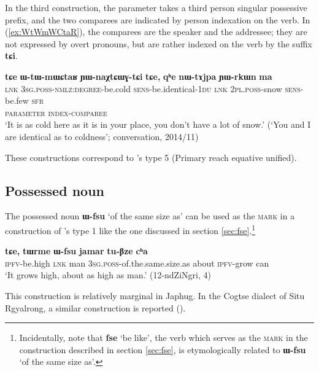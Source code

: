 \documentclass[oneside,a4paper,11pt]{article}
\newcommand{\ipa}[1]{{\phon\textbf{#1}}} %
\newcommand{\forme}[2]{\ipa{#1} `#2'}
\begin{document}
In the third construction, the parameter takes a third person singular possessive prefix, and the two comparees are indicated by person indexation on the verb. In (\ref{ex:WtWmWCtaR}), the comparees are the speaker and the addressee; they are not expressed by overt pronouns, but are rather indexed on the verb by the suffix \ipa{tɕi}.

\begin{exe}
\ex \label{ex:WtWmWCtaR}
\glll
\ipa{tɕe} 	\ipa{ɯ-tɯ-mɯɕtaʁ} 	\ipa{ɲɯ-naχtɕɯɣ-tɕi} 	\ipa{tɕe,} 	\ipa{qʰe} 	\ipa{nɯ-tɤjpa} 	\ipa{ɲɯ-rkɯn} 	\ipa{ma} \\
\textsc{lnk} \textsc{3sg.poss-nmlz:degree}-be.cold \textsc{sens}-be.identical-\textsc{1du} \textsc{lnk} \textsc{2pl.poss}-snow \textsc{sens}-be.few \textsc{sfr} \\
{ } \textsc{parameter} \textsc{index-comparee} \\
\glt `It is as cold here as it is in your place, you don't have a lot of snow.' (`You and I are identical as to coldness'; conversation, 2014/11)
\end{exe}

These constructions correspond to \citet{haspelmath17equative}'s type 5 (Primary reach equative unified).

\subsection{Possessed noun} \label{sec:Wfsu}
The possessed noun \forme{ɯ-fsu}{of the same size as} can be used as the \textsc{mark} in a construction of \citet{haspelmath17equative}'s type 1 like the one discussed in section \ref{sec:fse}.\footnote{Incidentally, note that \forme{fse}{be like}, the verb which serves as the \textsc{mark} in the construction described in section \ref{sec:fse}, is etymologically related to \forme{ɯ-fsu}{of the same size as}.}

\begin{exe}
\ex \label{ex:Wfsu}
\gll \ipa{tu-mbro} 	\ipa{tɕe,} 	\ipa{tɯrme} 	\ipa{ɯ-fsu} 	\ipa{jamar} 	\ipa{tu-βze} 	\ipa{cʰa} \\
\textsc{ipfv}-be.high \textsc{lnk} man \textsc{3sg.poss}-of.the.same.size.as about \textsc{ipfv}-grow can \\
\glt `It grows high, about as high as man.' (12-ndZiNgri, 4)
\end{exe}

This construction is relatively marginal in Japhug. In the Cogtse dialect of Situ Rgyalrong, a similar construction is reported (\citealt[377]{linxr93jiarong}).
\end{document}
